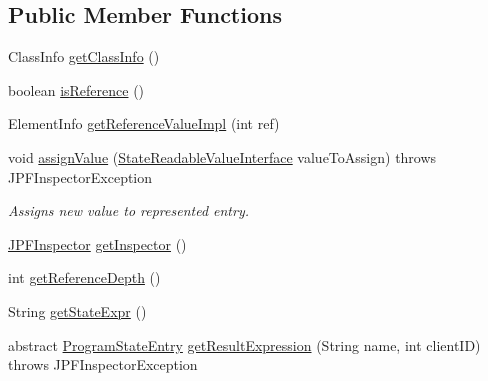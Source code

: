 \subsection*{Public Member Functions}
\begin{DoxyCompactItemize}
\item 
Class\+Info \hyperlink{classgov_1_1nasa_1_1jpf_1_1inspector_1_1server_1_1programstate_1_1_state_value_a493f2e74b201fc3972422974ed7f570e}{get\+Class\+Info} ()
\item 
boolean \hyperlink{classgov_1_1nasa_1_1jpf_1_1inspector_1_1server_1_1programstate_1_1_state_value_ab8084c95fa605147087304bc1f3b3df1}{is\+Reference} ()
\item 
Element\+Info \hyperlink{classgov_1_1nasa_1_1jpf_1_1inspector_1_1server_1_1programstate_1_1_state_value_a4e7c8315bae647ff76504d67299b523c}{get\+Reference\+Value\+Impl} (int ref)
\item 
void \hyperlink{classgov_1_1nasa_1_1jpf_1_1inspector_1_1server_1_1programstate_1_1_state_value_a72f5bb773f88bf20f94de7ab44bbeef0}{assign\+Value} (\hyperlink{interfacegov_1_1nasa_1_1jpf_1_1inspector_1_1server_1_1programstate_1_1_state_readable_value_interface}{State\+Readable\+Value\+Interface} value\+To\+Assign)  throws J\+P\+F\+Inspector\+Exception 
\begin{DoxyCompactList}\small\item\em Assigns new value to represented entry. \end{DoxyCompactList}\item 
\hyperlink{classgov_1_1nasa_1_1jpf_1_1inspector_1_1server_1_1jpf_1_1_j_p_f_inspector}{J\+P\+F\+Inspector} \hyperlink{classgov_1_1nasa_1_1jpf_1_1inspector_1_1server_1_1programstate_1_1_state_node_af07846313e0632df18008b5bf571f805}{get\+Inspector} ()
\item 
int \hyperlink{classgov_1_1nasa_1_1jpf_1_1inspector_1_1server_1_1programstate_1_1_state_node_af59b1ac0319251e657293c810a16cdd9}{get\+Reference\+Depth} ()
\item 
String \hyperlink{classgov_1_1nasa_1_1jpf_1_1inspector_1_1server_1_1programstate_1_1_state_node_a54c1c8d91f93c078171589f844252bdf}{get\+State\+Expr} ()
\item 
abstract \hyperlink{classgov_1_1nasa_1_1jpf_1_1inspector_1_1common_1_1pse_1_1_program_state_entry}{Program\+State\+Entry} \hyperlink{classgov_1_1nasa_1_1jpf_1_1inspector_1_1server_1_1programstate_1_1_state_node_ab9c4c8143bedd60118c9d144f81b66fc}{get\+Result\+Expression} (String name, int client\+ID)  throws J\+P\+F\+Inspector\+Exception
\item 

\end{DoxyCompactItemize}
